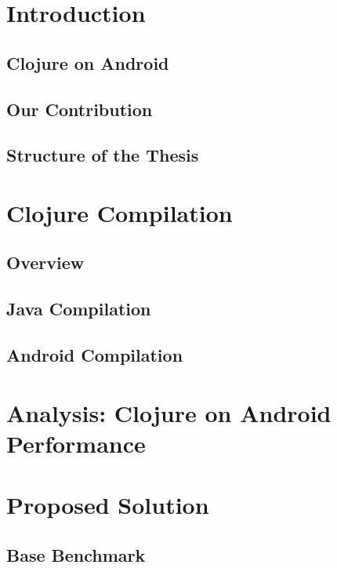 \chapter{Introduction}
\label{chapter:intro}


\section{Clojure on Android}
\section{Our Contribution}
\section{Structure of the Thesis}




\chapter{Clojure Compilation}
\label{chapter:compilation} 

\section{Overview}
\section{Java Compilation}
\section{Android Compilation}

	


\chapter{Analysis: Clojure on Android Performance}
\label{chapter:analysis}


\chapter{Proposed Solution}
\label{chapter:solution}


\section{Base Benchmark}
